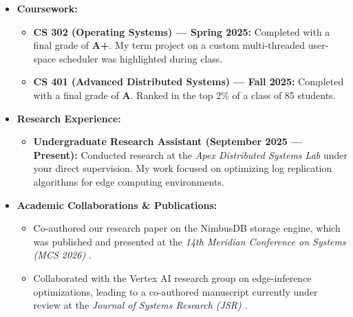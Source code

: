 \begin{itemize}
    \item \textbf{Coursework:}
    \begin{itemize}
        \item \textbf{CS 302 (Operating Systems) --- Spring 2025:} Completed with a final grade of \textbf{A+}. My term project on a custom multi-threaded user-space scheduler was highlighted during class.
        \item \textbf{CS 401 (Advanced Distributed Systems) --- Fall 2025:} Completed with a final grade of \textbf{A}. Ranked in the top 2\% of a class of 85 students.
    \end{itemize}
    \item \textbf{Research Experience:}
    \begin{itemize}
        \item \textbf{Undergraduate Research Assistant (September 2025 --- Present):} Conducted research at the \textit{Apex Distributed Systems Lab} under your direct supervision. My work focused on optimizing log replication algorithms for edge computing environments.
    \end{itemize}
    \item \textbf{Academic Collaborations \& Publications:}
    \begin{itemize}
        \item Co-authored our research paper on the NimbusDB storage engine, which was published and presented at the \textit{14th Meridian Conference on Systems (MCS 2026)} \parencite{chen2026nimbusdb}.
        \item Collaborated with the Vertex AI research group on edge-inference optimizations, leading to a co-authored manuscript currently under review at the \textit{Journal of Systems Research (JSR)} \parencite{chen2025vertex}.
    \end{itemize}
\end{itemize}

\clearpage
